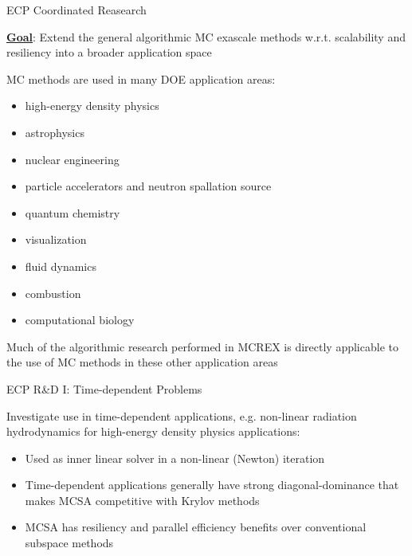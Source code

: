 \documentclass{beamer}
\begin{document}
\begin{frame}{ECP Coordinated Reasearch}

  \underline{\bf Goal}: Extend the general algorithmic MC exascale methods
  w.r.t. scalability and resiliency into a broader application space

  \vfill
  
  MC methods are used in many DOE application areas:
  \begin{itemize}
    \setlength{\itemsep}{-0.2\baselineskip}
  \item high-energy density physics
  \item astrophysics
  \item nuclear engineering
  \item particle accelerators and neutron spallation source
  \item quantum chemistry
  \item visualization
  \item fluid dynamics
  \item combustion
  \item computational biology
  \end{itemize}

  Much of the algorithmic research performed in MCREX is directly applicable
  to the use of MC methods in these other application areas

\end{frame}


\begin{frame}{ECP R\&D I: Time-dependent Problems}

  Investigate use in time-dependent applications, e.g. non-linear radiation
  hydrodynamics for high-energy density physics applications:
  \begin{itemize}
  \item Used as inner linear solver in a non-linear (Newton) iteration
  \item Time-dependent applications generally have strong diagonal-dominance
    that makes MCSA competitive with Krylov methods
  \item MCSA has resiliency and parallel efficiency benefits over conventional
    subspace methods
  \end{itemize}

\end{frame}

\end{document}
